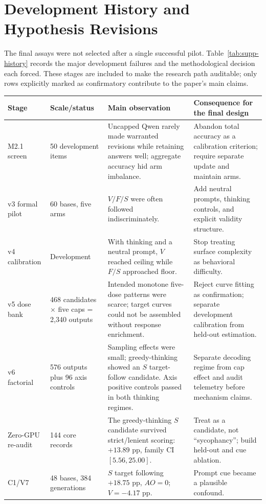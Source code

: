 \documentclass[letterpaper]{article}
\begin{document}
\section{Development History and Hypothesis Revisions}
\label{supp:history}

The final assays were not selected after a single successful pilot.  Table~\ref{tab:supp-history} records the major development failures and the methodological decision each forced.  These stages are included to make the research path auditable; only rows explicitly marked as confirmatory contribute to the paper's main claims.

\begin{table}[t]
\centering
\scriptsize
\begin{tabularx}{\textwidth}{L{1.65cm}L{2.1cm}L{3.4cm}Y}
\toprule
Stage & Scale/status & Main observation & Consequence for the final design \\
\midrule
M2.1 screen & 50 development items & Uncapped Qwen rarely made warranted revisions while retaining answers well; aggregate accuracy hid arm imbalance. & Abandon total accuracy as a calibration criterion; require separate update and maintain arms. \\
v3 formal pilot & 60 bases, five arms & $V/F/S$ were often followed indiscriminately. & Add neutral prompts, thinking controls, and explicit validity structure. \\
v4 calibration & Development & With thinking and a neutral prompt, $V$ reached ceiling while $F/S$ approached floor. & Stop treating surface complexity as behavioral difficulty. \\
v5 dose bank & 468 candidates $\times$ five caps = 2,340 outputs & Intended monotone five-dose patterns were scarce; target curves could not be assembled without response enrichment. & Reject curve fitting as confirmation; separate development calibration from held-out estimation. \\
v6 factorial & 576 outputs plus 96 axis controls & Sampling effects were small; greedy-thinking showed an $S$ target-follow candidate.  Axis positive controls passed in both thinking regimes. & Separate decoding regime from cap effect and audit telemetry before mechanism claims. \\
Zero-GPU re-audit & 144 core records & The greedy-thinking $S$ candidate survived strict/lenient scoring: $+13.89$ pp, family CI $[5.56,25.00]$. & Treat as a candidate, not ``sycophancy''; build held-out and cue ablation. \\
C1/V7 & 48 bases, 384 generations & $S$ target following $+18.75$ pp, $AO=0$; $V=-4.17$ pp. & Prompt cue became a plausible confound. \\

\end{tabularx}
\end{table}
\end{document}
